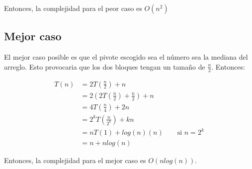 Entonces, la complejidad para el peor caso es $O(n^2)$

\subsection{Mejor caso}

El mejor caso posible es que el pivote escogido sea el número sea la mediana del arreglo. Esto provocaria que los dos bloques tengan un tamaño de $\frac{n}{2}$. Entonces:

\begin{align*}
    T(n) & = 2T\left(\frac{n}{2}\right) + n                           \\
         & = 2\left(2T\left(\frac{n}{2}\right)+\frac{n}{2}\right) + n \\
         & = 4T\left(\frac{n}{4}\right)+2n                            \\
         & = 2^k T\left(\frac{n}{2^k}\right) + kn                     \\
         & =nT(1)+ log(n)(n) \qquad \text{si } n=2^k                  \\
         & = n+ nlog(n)
\end{align*}

Entonces, la complejidad para el mejor caso es $O(nlog(n))$.